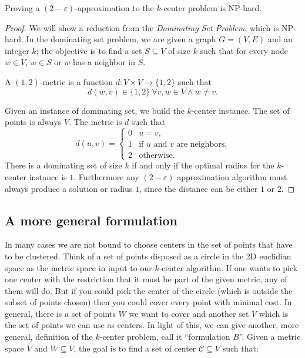 \begin{thm}
	Proving a $(2-\varepsilon)$-approximation to the $k$-center problem is NP-hard.
\end{thm}
\begin{proof}
	We will show a reduction from the \emph{Dominating Set Problem}, which is NP-hard. In the dominating set problem, we are given a graph $G=(V, E)$ and an integer $k$; the objective is to find a set $S \subseteq V$ of size $k$ such that for every node  $w \in V$, $w \in S$ or $w$ has a neighbor in $S$.
	
	\begin{defn}[$(1,2)$-metric]
		A $(1,2)$-metric is a function $d:V\times V \rightarrow \{1, 2\}$ such that 
		$$d(w, v) \in \{1, 2\}\ \forall v, w \in V \wedge w \neq v.$$
	\end{defn}
	
	 Given an instance of dominating set, we build the $k$-center instance. The set of points is always $V$. The metric is $d$ such that
	\begin{equation}
		d(u, v) = \begin{cases}
		0 & u = v,\\
		1 & \text{if $u$ and $v$ are neighbors,}\\
		2 & \text{otherwise.}
		\end{cases}
	\end{equation}
 There is a dominating set of size $k$ if and only if the optimal radius for the $k$-center instance is $1$. Furthermore any $(2 -\varepsilon)$ approximation algorithm must always produce a solution or radius $1$, since the distance can be either $1$ or $2$.
\end{proof}

\subsection{A more general formulation}

In many cases we are not bound to choose centers in the set of points that have to be clustered. Think of a set of points disposed as a circle in the 2D euclidian space as the metric space in input to our $k$-center algorithm. If one wants to pick one center with the restriction that it must be part of the given metric, any of them will do. But if you could pick the center of the circle (which is outside the subset of points chosen) then you could cover every point with minimal cost. In general, there is a set of points $W$ we want to cover and another set $V$ which is the set of points we can use as centers. In light of this, we can give another, more general, definition of the $k$-center problem, call it ``formulation $B$''. Given a metric space $V$ and $W \subseteq V$, the goal is to find a set of center $\mathcal{C} \subseteq V$ such that:

